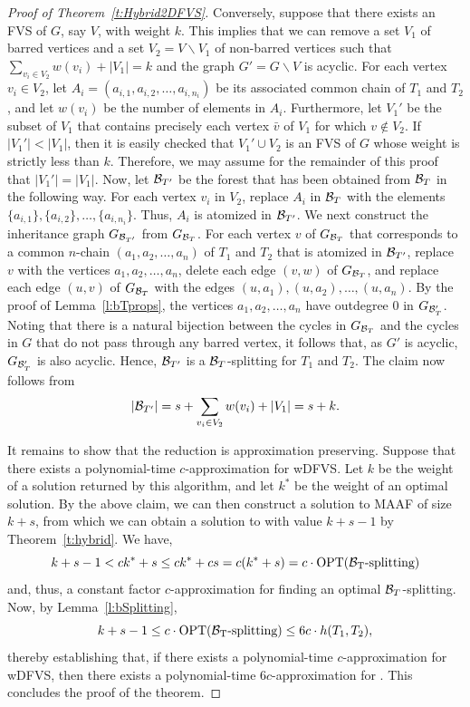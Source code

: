 \begin{proof}[Proof of Theorem~\ref{t:Hybrid2DFVS}]
Conversely, suppose that there exists an FVS of $G$, say $V$, with weight $k$. This implies that we can remove a set $V_1$ of barred vertices  and a set  $V_2=V\backslash V_1$ of non-barred vertices such that $\sum_{v_i\in V_2}w(v_i)+|V_1|=k$ and the graph  $G'=G\backslash V$ is acyclic. For each vertex $v_i\in V_2$, let $A_i=(a_{i,1},a_{i,2},\ldots,a_{i,n_i})$ be its associated common chain of $T_1$ and $T_2$, and let $w(v_i)$ be the number of elements in $A_i$. Furthermore, let $V_1'$ be the subset of $V_1$ that contains precisely each vertex $\bar{v}$ of $V_1$ for which $v\notin V_2$. If $|V_1'|<|V_1|$, then it is easily checked that $V_1'\cup V_2$ is an FVS of $G$ whose weight is strictly less than $k$. Therefore, we may assume for the remainder of this proof that $|V_1'|=|V_1|$. Now, let ${\mathcal B}_{T'}$ be the forest that has been obtained from ${\mathcal B}_T$ in the following way. For each vertex $v_i$ in $V_2$, replace $A_i$ in ${\mathcal B}_T$ with the elements $\{a_{i,1}\},\{a_{i,2}\},\ldots,\{a_{i,n_i}\}$. Thus, 
$A_i$ is atomized in  ${\mathcal B}_{T'}$. We next construct the inheritance graph $G_{{\mathcal B}_{T'}}$ from $G_{{\mathcal B}_T}$. For each vertex $v$ of $G_{{\mathcal B}_T}$ that corresponds to a common $n$-chain $(a_1,a_2,\ldots,a_n)$ of $T_1$ and $T_2$ that is atomized in ${\mathcal B}_{T'}$, replace $v$ with the vertices $a_1,a_2,\ldots,a_n$, delete each edge $(v,w)$ of $G_{{\mathcal B}_T}$, and replace each edge $(u,v)$ of $G_{{\mathcal B}_T}$ with the edges $(u,a_1),(u,a_2),\ldots,(u,a_n)$. By the proof of Lemma~\ref{l:bTprops}, the vertices $a_1,a_2,\ldots,a_n$ have outdegree 0 in $G_{{\mathcal B}_T'}$. Noting that there is a natural bijection between the cycles in $G_{{\mathcal B}_T}$ and the cycles in $G$ that do not pass through any barred vertex, it follows that, as $G'$ is acyclic, $G_{{\mathcal B}_T'}$ is also acyclic. Hence, ${\mathcal B}_{T'}$ is a ${\mathcal B}_T$-splitting for $T_1$ and $T_2$. The claim now follows from
$$|{\mathcal B}_{T'}|=s+\sum_{v_i\in V_2}w(v_i)+|V_1|=s+k.$$

It remains to show that the reduction is approximation preserving. Suppose that there exists a polynomial-time $c$-approximation for {\sc wDFVS}. Let $k$ be the weight of a solution returned by this algorithm, and let $k^*$ be the weight of an optimal solution. By the above claim, we can then construct a solution to {\sc MAAF} of size $k+s$, from which we can obtain a solution to \mh with value $k+s-1$ by Theorem~\ref{t:hybrid}. We have,
$$k + s - 1 < ck^*+s\leq ck^*+cs=c(k^*+s)=c\cdot{\rm OPT({\mathcal B}_T\mbox{-\rm splitting})}$$
and, thus, a constant factor $c$-approximation for finding an optimal ${\mathcal B}_T$-splitting. Now, by Lemma~\ref{l:bSplitting},
$$k + s - 1\leq c\cdot{\rm OPT({\mathcal B}_T\mbox{-\rm splitting})}\leq 6c\cdot h(T_1,T_2),$$
thereby establishing that, if there exists a polynomial-time $c$-approximation for {\sc wDFVS}, then there exists a polynomial-time $6c$-approximation for \mh. This concludes the proof of the theorem.
\end{proof}

